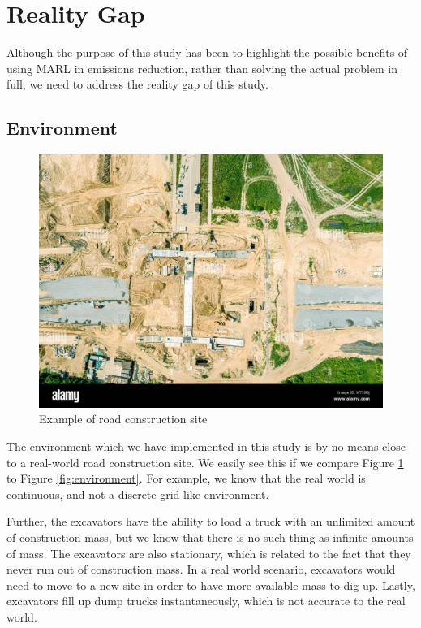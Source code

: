 \documentclass[conference]{IEEEtran}
\begin{document}
\section{Reality Gap}
Although the purpose of this study has been to highlight the possible benefits of using MARL in
emissions reduction, rather than solving the actual problem in full, we need to address the reality
gap of this study.



\subsection{Environment}
\begin{figure}[!ht]
	\includegraphics[width=\columnwidth]{graphs/road-construction-site-example.jpeg}
	\caption{Example of road construction site}
	\label{fig:construction-site}
\end{figure}

The environment which we have implemented in this study is by no means close to a
real-world road construction site. We easily see this if we compare Figure \ref{fig:construction-site}
to Figure \ref{fig:environment}. For example, we know that the real world is continuous, and not a discrete
grid-like environment.

Further, the excavators have the ability to load a truck with an unlimited amount of construction mass,
but we know that there is no such thing as infinite amounts of mass. The excavators are also stationary,
which is related to the fact that they never run out of construction mass. In a real world scenario,
excavators would need to move to a new site in order to have more available mass to dig up. Lastly,
excavators fill up dump trucks instantaneously, which is not accurate to the real world.
\end{document}
